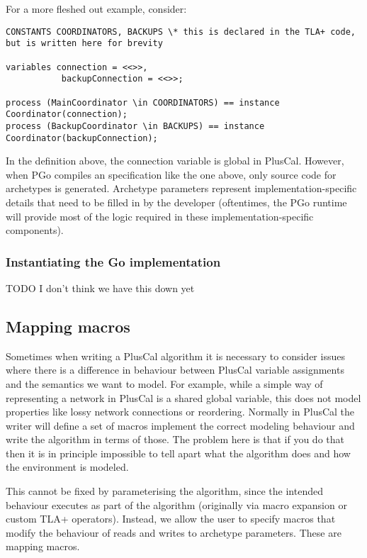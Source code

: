 For a more fleshed out example, consider:

\begin{lstlisting}[language=pcal]
CONSTANTS COORDINATORS, BACKUPS \* this is declared in the TLA+ code, but is written here for brevity

variables connection = <<>>,
           backupConnection = <<>>;

process (MainCoordinator \in COORDINATORS) == instance Coordinator(connection);
process (BackupCoordinator \in BACKUPS) == instance Coordinator(backupConnection);
\end{lstlisting}

In the definition above, the connection variable is global in PlusCal. However, when PGo compiles an specification like the one above, only source code for archetypes is generated. Archetype parameters represent implementation-specific details that need to be filled in by the developer (oftentimes, the PGo runtime will provide most of the logic required in these implementation-specific components).

\subsubsection{Instantiating the Go implementation}

TODO I don't think we have this down yet

\subsection{Mapping macros}

Sometimes when writing a PlusCal algorithm it is necessary to consider issues where there is a difference in behaviour between PlusCal variable assignments and the semantics we want to model. For example, while a simple way of representing a network in PlusCal is a shared global variable, this does not model properties like lossy network connections or reordering. Normally in PlusCal the writer will define a set of macros implement the correct modeling behaviour and write the algorithm in terms of those. The problem here is that if you do that then it is in principle impossible to tell apart what the algorithm does and how the environment is modeled.

This cannot be fixed by parameterising the algorithm, since the intended behaviour executes as part of the algorithm (originally via macro expansion or custom TLA+ operators). Instead, we allow the user to specify macros that modify the behaviour of reads and writes to archetype parameters. These are mapping macros.

